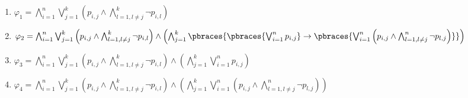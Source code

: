 \begin{solution}

\phantom{}

\begin{enumerate}[label = \arabic*.]

  \item $\varphi_1 = \bigwedge_{i=1}^n \bigvee_{j=1}^k\left(p_{i,j} \land \bigwedge_{l=1,l\neq j}^{k}\neg p_{i,l}\right)$

  \item $\varphi_2 = \bigwedge_{i=1}^n \bigvee_{j=1}^k\left(p_{i,j} \land \bigwedge_{l=1,l\neq j}^{k}\neg p_{i,l}\right)
  \land  \left(\bigwedge_{j=1}^k \pbraces{\pbraces{\bigvee_{i=1}^n p_{i,j}} \rightarrow \pbraces{\bigvee_{i=1}^n\left(p_{i,j} \land \bigwedge_{l=1,l\neq j}^{n}\neg p_{l,j}\right)}}\right)$

  \item $\varphi_3 = \bigwedge_{i=1}^n \bigvee_{j=1}^k\left(p_{i,j} \land \bigwedge_{l=1,l\neq j}^{k}\neg p_{i,l}\right) \land
  \left(\bigwedge_{j=1}^k \bigvee_{i=1}^np_{i,j}\right)$

  \item $\varphi_4 = \bigwedge_{i=1}^n \bigvee_{j=1}^k\left(p_{i,j} \land \bigwedge_{l=1,l\neq j}^{k}\neg p_{i,l}\right)
  \land  \left(\bigwedge_{j=1}^k \bigvee_{i=1}^n\left(p_{i,j} \land \bigwedge_{l=1,l\neq j}^{n}\neg p_{l,j}\right)\right)$

\end{enumerate}

\end{solution}

